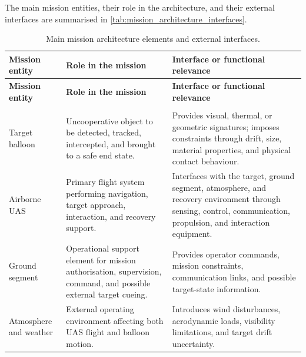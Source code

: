 The main mission entities, their role in the architecture, and their external interfaces are summarised in \autoref{tab:mission_architecture_interfaces}.
\vspace{-10pt}
\begin{longtable}{
    >{\raggedright\arraybackslash}p{}
    >{\raggedright\arraybackslash}p{}
    >{\raggedright\arraybackslash}p{}
}
\caption{Main mission architecture elements and external interfaces.}
\label{tab:mission_architecture_interfaces}\\

\toprule
\textbf{Mission entity} & \textbf{Role in the mission} & \textbf{Interface or functional relevance} \\
\midrule
\endfirsthead

\toprule
\textbf{Mission entity} & \textbf{Role in the mission} & \textbf{Interface or functional relevance} \\
\midrule
\endhead

\midrule
\multicolumn{3}{r}{\textit{Continued on next page}}\\
\endfoot

\bottomrule
\endlastfoot

Target balloon &
Uncooperative object to be detected, tracked, intercepted, and brought to a safe end state. &
Provides visual, thermal, or geometric signatures; imposes constraints through drift, size, material properties, and physical contact behaviour. \\

\addlinespace

Airborne UAS &
Primary flight system performing navigation, target approach, interaction, and recovery support. &
Interfaces with the target, ground segment, atmosphere, and recovery environment through sensing, control, communication, propulsion, and interaction equipment. \\

\addlinespace

Ground segment &
Operational support element for mission authorisation, supervision, command, and possible external target cueing. &
Provides operator commands, mission constraints, communication links, and possible target-state information. \\

\addlinespace

Atmosphere and weather &
External operating environment affecting both UAS flight and balloon motion. &
Introduces wind disturbances, aerodynamic loads, visibility limitations, and target drift uncertainty. \\


\end{longtable}
